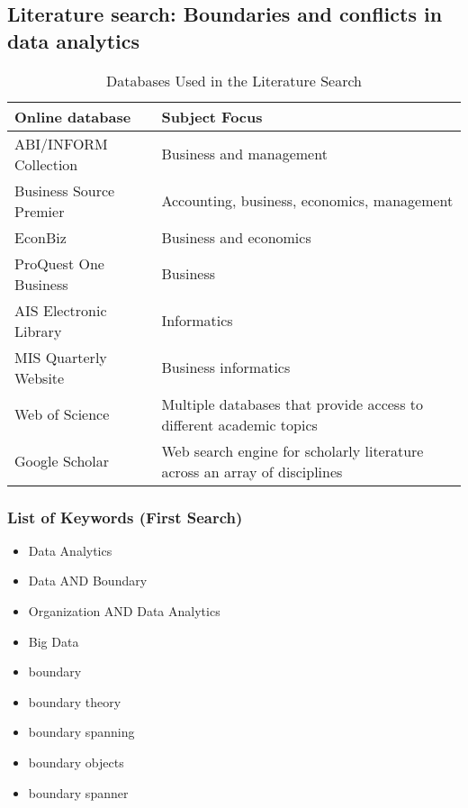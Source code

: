 \subsection*{Literature search: Boundaries and conflicts in data analytics}

\begin{table}[htbp]
    \centering
    \small
    \begin{tabular}{lL{8cm}}
    \hline
    Online database           & Subject Focus                                                          \\ \hline
    ABI/INFORM Collection     & Business and management                                                \\
    Business Source Premier   & Accounting, business, economics, management                            \\
    EconBiz                   & Business and economics                                                 \\
    ProQuest One Business     & Business                                                               \\
    AIS Electronic Library    & Informatics                                                            \\
    MIS Quarterly Website     & Business informatics                                                   \\
    Web of Science            & Multiple databases that provide access to different academic topics    \\
    Google Scholar            & Web search engine for scholarly literature across an array of disciplines \\ \hline
    \end{tabular}
    \caption{Databases Used in the Literature Search}
    \label{literature_search_db}
    \end{table}
    
\subsubsection*{List of Keywords (First Search)}

\begin{itemize}
    \item Data Analytics
	\item Data AND Boundary
	\item Organization AND Data Analytics
	\item Big Data
	\item boundary 
	\item boundary theory
	\item boundary spanning
	\item boundary objects
    \item boundary spanner
\end{itemize}


